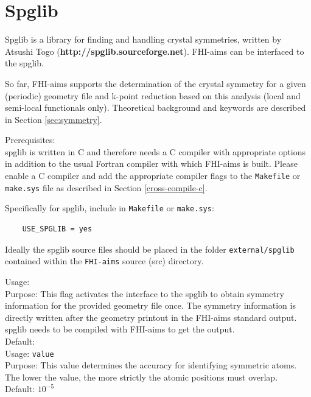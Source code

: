 \section{Spglib}
\label{app:spglib}
Spglib is a library for finding and handling crystal
symmetries, written by Atsushi Togo
(\textbf{http://spglib.sourceforge.net}). FHI-aims can be interfaced
to the spglib.  

So far, FHI-aims supports the determination
of the crystal symmetry for a given 
(periodic) geometry file and k-point reduction based on this analysis 
(local and semi-local functionals only). Theoretical background and 
keywords are described in Section \ref{sec:symmetry}.

Prerequisites: \\

spglib is written in C and therefore needs a C compiler with
appropriate options in addition to the usual Fortran compiler with
which FHI-aims is built. Please enable a C compiler and add the
appropriate compiler flags to the \texttt{Makefile} or
\texttt{make.sys} file as described in Section \ref{cross-compile-c}. 

Specifically for spglib, include in \texttt{Makefile} or \texttt{make.sys}:\\
  
\begin{verbatim}
    USE_SPGLIB = yes
\end{verbatim}

Ideally the spglib source files should be placed in the folder \texttt{external/spglib} 
contained within the \texttt{FHI-aims} source (src) directory.

{
  \noindent
  Usage:   \\[1.0ex]  
  Purpose: This flag activates the interface to the spglib to obtain 
  symmetry information for the provided geometry file once.
  The symmetry information is directly written after the geometry printout
  in the FHI-aims standard output. spglib needs to be compiled with FHI-aims 
  to get the output. \\[1.0ex]
  Default:  \\
}
{
  \noindent
  Usage:  \texttt{value} \\[1.0ex]  
  Purpose: This value determines the accuracy for identifying symmetric atoms. 
  The lower the value, the more strictly the atomic positions must overlap.\\[1.0ex] 
  Default: $10^{-5}$
}

